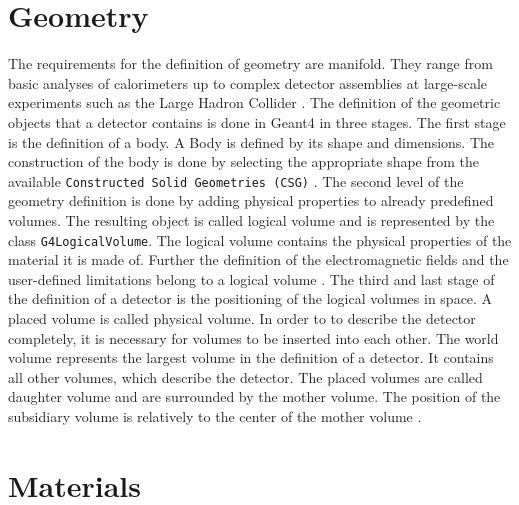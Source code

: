 \documentclass[12pt, a4paper]{thesis}
\begin{document}
\section{Geometry}
\label{sec:org8d2fc6f}

The requirements for the definition of geometry are manifold. They range from
basic analyses of calorimeters up to complex detector assemblies at large-scale
experiments such as the Large Hadron Collider \cite{geant4_geom}. The definition
of the geometric objects that a detector contains is done in Geant4 in three
stages.  The first stage is the definition of a body. A Body is defined by its
shape and dimensions. The construction of the body is done by selecting the
appropriate shape from the available \texttt{Constructed Solid Geometries (CSG)}
\cite{geant4_geom}. The second level of the geometry definition is done by adding
physical properties to already predefined volumes. The resulting object is called
logical volume and is represented by the class \texttt{G4LogicalVolume}. The logical
volume contains the physical properties of the material it is made of. Further the
definition of the electromagnetic fields and the user-defined limitations belong
to a logical volume \cite{geant4-doc}. The third and last stage of the definition
of a detector is the positioning of the logical volumes in space. A placed
volume is called physical volume. In order to to describe the detector
completely, it is necessary for volumes to be inserted into each other.  The
world volume represents the largest volume in the definition of a detector. It
contains all other volumes, which describe the detector. The placed volumes are
called daughter volume and are surrounded by the mother volume.  The position of
the subsidiary volume is relatively to the center of the mother volume
\cite{geant4-doc}.

\section{Materials}
\label{sec:org11f3d27}
\end{document}
